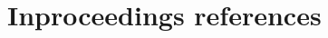 \documentclass[twoside]{article}
\begin{document}
    \section{Inproceedings references}

    \nocite{*}
    \printbibliography

    
\end{document}
